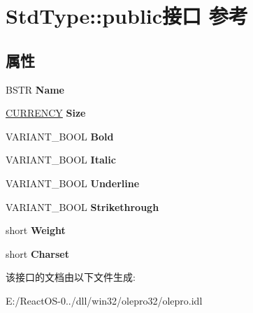 \hypertarget{interface_std_type_1_1public}{}\section{Std\+Type\+:\+:public接口 参考}
\label{interface_std_type_1_1public}
\subsection*{属性}
\begin{DoxyCompactItemize}
\item 
\mbox{\label{interface_std_type_1_1public_a8e8dfd40930a47670de36bc29fee5163}} 
B\+S\+TR {\bfseries Name}
\item 
\mbox{\label{interface_std_type_1_1public_a2708a65bdd39de6306802ff27fcea465}} 
\hyperlink{uniontag_c_y}{C\+U\+R\+R\+E\+N\+CY} {\bfseries Size}
\item 
\mbox{\label{interface_std_type_1_1public_a0eaf348ee8cb4263921500ba41108f5b}} 
V\+A\+R\+I\+A\+N\+T\+\_\+\+B\+O\+OL {\bfseries Bold}
\item 
\mbox{\label{interface_std_type_1_1public_aa64633f3dd12adc6d4e4c3a786e467bf}} 
V\+A\+R\+I\+A\+N\+T\+\_\+\+B\+O\+OL {\bfseries Italic}
\item 
\mbox{\label{interface_std_type_1_1public_a0dc8ae5a070d89119212ed5fe1606d45}} 
V\+A\+R\+I\+A\+N\+T\+\_\+\+B\+O\+OL {\bfseries Underline}
\item 
\mbox{\label{interface_std_type_1_1public_a113383f6722fb21e7482458ecf579efa}} 
V\+A\+R\+I\+A\+N\+T\+\_\+\+B\+O\+OL {\bfseries Strikethrough}
\item 
\mbox{\label{interface_std_type_1_1public_a813a7f9a9ae3a94c0c1230866231be55}} 
short {\bfseries Weight}
\item 
\mbox{\label{interface_std_type_1_1public_a22ce10674f10c5e27fe15fff44a641dd}} 
short {\bfseries Charset}
\end{DoxyCompactItemize}


该接口的文档由以下文件生成\+:\begin{DoxyCompactItemize}
\item 
E\+:/\+React\+O\+S-\/0../dll/win32/olepro32/olepro.\+idl\end{DoxyCompactItemize}
